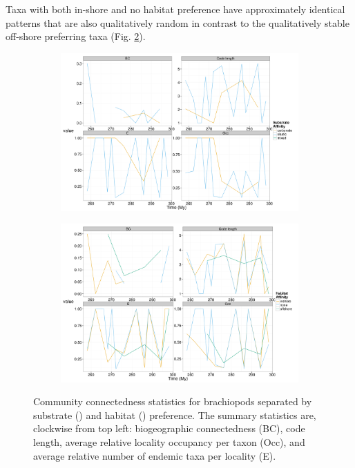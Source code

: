 \documentclass[12pt,letterpaper]{article}
\begin{document}
Taxa with both in-shore and no habitat preference have approximately identical patterns that are also qualitatively random in contrast to the qualitatively stable off-shore preferring taxa (Fig. \ref{subfig:hab_net}). 

\begin{figure}[ht]
  \begin{center}
    \begin{subfigure}[b]{0.4\textwidth}
      \caption{}
      \includegraphics[width = \textwidth, keepaspectratio = true]{figure/substrate_network}
      \label{subfig:sub_net}
    \end{subfigure}
    \begin{subfigure}[b]{0.4\textwidth}
      \caption{}
      \includegraphics[width = \textwidth, keepaspectratio = true]{figure/habitat_network}
      \label{subfig:hab_net}
    \end{subfigure}
  \end{center}
  \caption[Trait based brachiopod community connectedness summary statistics]{Community connectedness statistics for brachiopods separated by substrate () and habitat () preference. The summary statistics are, clockwise from top left: biogeographic connectedness (BC), code length, average relative locality occupancy per taxon (Occ), and average relative number of endemic taxa per locality (E).} 
  \label{fig:trait_net}
\end{figure}
\end{document}
